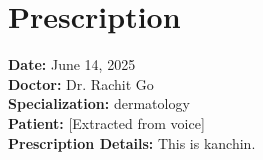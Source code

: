 \documentclass[a4paper,12pt]{article}
\begin{document}
        \section*{Prescription}
        \textbf{Date:} June 14, 2025 \\
        \textbf{Doctor:} Dr. Rachit Go \\
        \textbf{Specialization:} dermatology \\
        \textbf{Patient:} [Extracted from voice] \\
        \textbf{Prescription Details:} This is kanchin.

        
\end{document}
